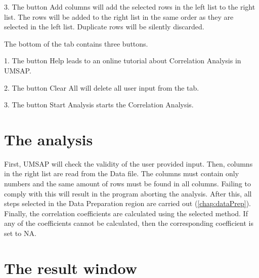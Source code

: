 \num{3}. The button Add columns will add the selected rows in the left list to
the right list. The rows will be added to the right list in the same order as
they are selected in the left list. Duplicate rows will be silently discarded.

The bottom of the tab contains three buttons.

\num{1}. The button Help leads to an online tutorial about Correlation Analysis in
UMSAP.

\num{2}. The button Clear All will delete all user input from the tab.

\num{3}. The button Start Analysis starts the Correlation Analysis.

\section{The analysis}

First, UMSAP will check the validity of the user provided input. Then, columns in
the right list are read from the Data file. The columns must contain only numbers
and the same amount of rows must be found in all columns. Failing to comply with
this will result in the program aborting the analysis. After this, all steps selected
in the Data Preparation region are carried out (\autoref{chap:dataPrep}). Finally,
the correlation coefficients are calculated using the selected method. If any of
the coefficients cannot be calculated, then the corresponding coefficient is set to NA.

\section{The result window}


